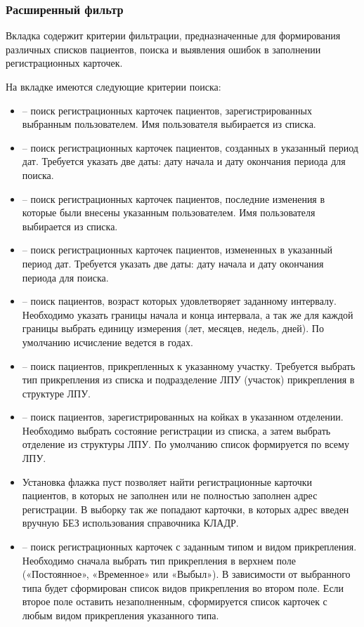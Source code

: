 \subsubsection {Расширенный фильтр}

Вкладка  содержит критерии фильтрации, предназначенные для формирования различных списков пациентов, поиска и выявления ошибок в заполнении регистрационных карточек.

На вкладке имеются следующие критерии поиска:
\begin{itemize}
 \item {} – поиск регистрационных карточек пациентов, зарегистрированных выбранным пользователем. Имя пользователя выбирается из списка.
 \item	{} – поиск регистрационных карточек пациентов, созданных в указанный период дат. Требуется указать две даты: дату начала и дату окончания периода для поиска.
 \item	{} – поиск регистрационных карточек пациентов, последние изменения в которые были внесены указанным пользователем. Имя пользователя выбирается из списка.
 \item	{} – поиск регистрационных карточек пациентов, измененных в указанный период дат. Требуется указать две даты: дату начала и дату окончания периода для поиска.
 \item	{} – поиск пациентов, возраст которых удовлетворяет заданному интервалу. Необходимо указать границы начала и конца интервала, а так же для каждой границы выбрать единицу измерения (лет, месяцев, недель, дней). По умолчанию исчисление ведется в годах.
 \item {} – поиск пациентов, прикрепленных к указанному участку. Требуется выбрать тип прикрепления из списка и подразделение ЛПУ (участок) прикрепления в структуре ЛПУ.
 \item	{} – поиск пациентов, зарегистрированных на койках в указанном отделении. Необходимо выбрать состояние регистрации из списка, а затем выбрать отделение из структуры ЛПУ. По умолчанию список формируется по всему ЛПУ.
 \item	Установка флажка  пуст позволяет найти регистрационные карточки пациентов, в которых не заполнен или не полностью заполнен адрес регистрации. В выборку так же попадают карточки, в которых адрес введен вручную БЕЗ использования справочника КЛАДР.
 \item {} – поиск регистрационных карточек с заданным типом и видом прикрепления. Необходимо сначала выбрать тип прикрепления в верхнем поле («Постоянное», «Временное» или «Выбыл»). В зависимости от выбранного типа будет сформирован список видов прикрепления во втором поле. Если второе поле оставить незаполненным, сформируется список карточек с любым видом прикрепления указанного типа.

\end{itemize}
